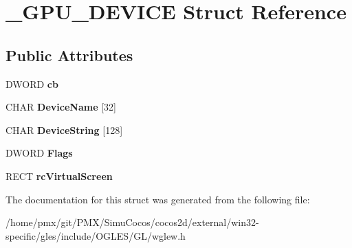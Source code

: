 \hypertarget{struct__GPU__DEVICE}{}\section{\+\_\+\+G\+P\+U\+\_\+\+D\+E\+V\+I\+CE Struct Reference}
\label{struct__GPU__DEVICE}
\subsection*{Public Attributes}
\begin{DoxyCompactItemize}
\item 
\mbox{\label{struct__GPU__DEVICE_afcb22f16ba9e526610489ff56ab78ddb}} 
D\+W\+O\+RD {\bfseries cb}
\item 
\mbox{\label{struct__GPU__DEVICE_acdb1f0d784d7527ec04163439eff9038}} 
C\+H\+AR {\bfseries Device\+Name} \mbox{[}32\mbox{]}
\item 
\mbox{\label{struct__GPU__DEVICE_a50b7b6a8eb397001ada4f5f918cc8065}} 
C\+H\+AR {\bfseries Device\+String} \mbox{[}128\mbox{]}
\item 
\mbox{\label{struct__GPU__DEVICE_a008db9d0f5fc13a5160805f40465f14a}} 
D\+W\+O\+RD {\bfseries Flags}
\item 
\mbox{\label{struct__GPU__DEVICE_aeb573bbeb3b6c589246720ef259b9a27}} 
R\+E\+CT {\bfseries rc\+Virtual\+Screen}
\end{DoxyCompactItemize}


The documentation for this struct was generated from the following file\+:\begin{DoxyCompactItemize}
\item 
/home/pmx/git/\+P\+M\+X/\+Simu\+Cocos/cocos2d/external/win32-\/specific/gles/include/\+O\+G\+L\+E\+S/\+G\+L/wglew.\+h\end{DoxyCompactItemize}

